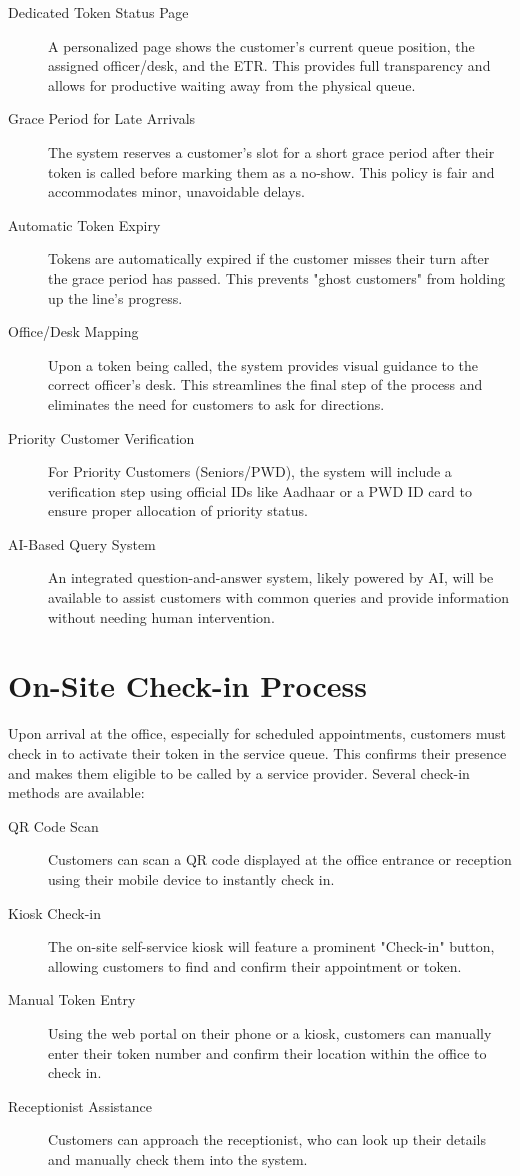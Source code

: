 \documentclass{article}
\begin{document}
\begin{description}
    \item[Dedicated Token Status Page] A personalized page shows the customer's current queue position, the assigned officer/desk, and the ETR. This provides full transparency and allows for productive waiting away from the physical queue.
    \item[Grace Period for Late Arrivals] The system reserves a customer's slot for a short grace period after their token is called before marking them as a no-show. This policy is fair and accommodates minor, unavoidable delays.
    \item[Automatic Token Expiry] Tokens are automatically expired if the customer misses their turn after the grace period has passed. This prevents "ghost customers" from holding up the line's progress.
    \item[Office/Desk Mapping] Upon a token being called, the system provides visual guidance to the correct officer's desk. This streamlines the final step of the process and eliminates the need for customers to ask for directions.
    \item[Priority Customer Verification] For Priority Customers (Seniors/PWD), the system will include a verification step using official IDs like Aadhaar or a PWD ID card to ensure proper allocation of priority status.
    \item[AI-Based Query System] An integrated question-and-answer system, likely powered by AI, will be available to assist customers with common queries and provide information without needing human intervention.
\end{description}

\section{On-Site Check-in Process}

Upon arrival at the office, especially for scheduled appointments, customers must check in to activate their token in the service queue. This confirms their presence and makes them eligible to be called by a service provider. Several check-in methods are available:

\begin{description}
    \item[QR Code Scan] Customers can scan a QR code displayed at the office entrance or reception using their mobile device to instantly check in.
    \item[Kiosk Check-in] The on-site self-service kiosk will feature a prominent "Check-in" button, allowing customers to find and confirm their appointment or token.
    \item[Manual Token Entry] Using the web portal on their phone or a kiosk, customers can manually enter their token number and confirm their location within the office to check in.
    \item[Receptionist Assistance] Customers can approach the receptionist, who can look up their details and manually check them into the system.
\end{description}
\end{document}
